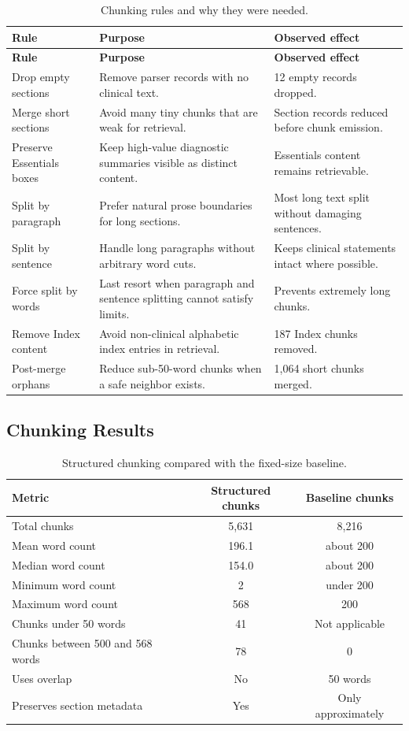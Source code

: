 \begin{longtable}{p{} p{} p{}}
\caption{Chunking rules and why they were needed.}
\label{tab:chunking_rules}\\
\toprule
\textbf{Rule} & \textbf{Purpose} & \textbf{Observed effect}\\
\midrule
\endfirsthead
\toprule
\textbf{Rule} & \textbf{Purpose} & \textbf{Observed effect}\\
\midrule
\endhead
Drop empty sections & Remove parser records with no clinical text. & 12 empty records dropped.\\
Merge short sections & Avoid many tiny chunks that are weak for retrieval. & Section records reduced before chunk emission.\\
Preserve Essentials boxes & Keep high-value diagnostic summaries visible as distinct content. & Essentials content remains retrievable.\\
Split by paragraph & Prefer natural prose boundaries for long sections. & Most long text split without damaging sentences.\\
Split by sentence & Handle long paragraphs without arbitrary word cuts. & Keeps clinical statements intact where possible.\\
Force split by words & Last resort when paragraph and sentence splitting cannot satisfy limits. & Prevents extremely long chunks.\\
Remove Index content & Avoid non-clinical alphabetic index entries in retrieval. & 187 Index chunks removed.\\
Post-merge orphans & Reduce sub-50-word chunks when a safe neighbor exists. & 1,064 short chunks merged.\\
\bottomrule
\end{longtable}

\subsection{Chunking Results}

\begin{table}[htbp]
\centering
\caption{Structured chunking compared with the fixed-size baseline.}
\label{tab:chunking_comparison}
\begin{tabular}{p{} c c}
\toprule
\textbf{Metric} & \textbf{Structured chunks} & \textbf{Baseline chunks}\\
\midrule
Total chunks & 5,631 & 8,216\\
Mean word count & 196.1 & about 200\\
Median word count & 154.0 & about 200\\
Minimum word count & 2 & under 200\\
Maximum word count & 568 & 200\\
Chunks under 50 words & 41 & Not applicable\\
Chunks between 500 and 568 words & 78 & 0\\
Uses overlap & No & 50 words\\
Preserves section metadata & Yes & Only approximately\\
\bottomrule
\end{tabular}
\end{table}


